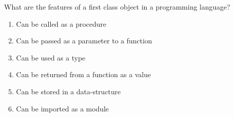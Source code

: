 \question What are the features of a first class object in a programming language?
\begin{enumerate}
\item Can be called as a procedure
\item Can be passed as a parameter to a function
\item Can be used as a type
\item Can be returned from a function as a value
\item Can be stored in a data-structure
\item Can be imported as a module
\end{enumerate}